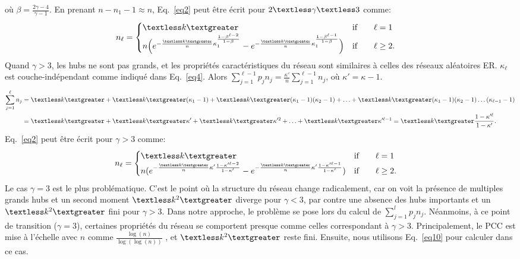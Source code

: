 où $\beta=\frac{2\gamma-4}{\gamma-1}$. En prenant $n-n_1-1 \approx n$, Eq.~\ref{eq2} peut être écrit pour $2\textless \gamma \textless 3$ comme:
\begin{align}
n_{\ell} &=
\begin{cases}
\km & \text{if}\qquad \ell=1 \\
n\Big(e^{-\frac{\km}{n}\kappa_1^{\frac{1-\beta^{\ell-2}}{1-\beta}}}-e^{-\frac{\km}{n}\kappa_1^{\frac{1-\beta^{\ell-1}}{1-\beta}}}\Big) & \text{if}\qquad \ell \ge 2.
\end{cases}
\label{eq8}
\end{align}
Quand $\gamma> 3 $, les hubs ne sont pas grands, et les propriétés caractéristiques du réseau sont similaires à celles des réseaux aléatoires ER.
 $\kappa_{\ell}$ est couche-indépendant comme indiqué dans Eq.~\ref{eq4}.
Alors $\sum_{j=1}^{\ell-1}p_j n_j=\frac{\kappa'}{n}\sum_{j=1}^{\ell-1}n_j$, où $\kappa'=\kappa-1$.  
\begin{align}
\sum_{j=1}^{\ell}n_j &=\km+\km(\kappa_1-1)+\km(\kappa_1-1)(\kappa_2-1)+\ldots+\km(\kappa_1-1)(\kappa_2-1)\ldots(\kappa_{\ell-1}-1) \nonumber\\
&=\km+\km\kappa'+\km\kappa'^2+\ldots+\km\kappa'^{\ell-1}=\km\frac{1-\kappa'^{\ell}}{1-\kappa'}. 
\label{eq9}
\end{align}
Eq.~\ref{eq2} peut être écrit pour $\gamma>3$ comme:
\begin{align}
n_{\ell} &=
\begin{cases}
\textless k \textgreater & \text{if}\qquad \ell=1 \\
n(e^{-\frac{\textless k \textgreater}{n}\kappa'\frac{1-\kappa'^{\ell-2}}{1-\kappa'}}-e^{-\frac{\km}{n}\kappa'\frac{1-\kappa'^{\ell-1}}{1-\kappa'}}) & \text{if}\qquad \ell \ge 2.
\end{cases}
\label{eq10}
\end{align}
Le cas $\gamma=3$ est le plus problématique. C'est le point où la structure du réseau change radicalement, car on voit la présence de multiples grands hubs et un second moment  $\textless k^2 \textgreater$ diverge pour $\gamma<3$, par contre une absence des hubs importants et un $\textless k^2  \textgreater$ fini pour $\gamma>3$.
Dans notre approche, le problème se pose lors du calcul de $\sum_{j=1}^{l}p_jn_j$. Néanmoins, à ce point de transition ($\gamma=3$), certaines propriétés du réseau se comportent presque comme celles correspondant à $\gamma>3$.
Principalement, le PCC est mise à l'échelle avec $n$ comme $\frac {\log(n)}{\log(\log(n))}$ \cite{Bollobas-Riordan2004}, et $\textless k^2  \textgreater$ reste fini. Ensuite, nous utilisons Eq.~\ref{eq10} pour calculer \nl dans ce cas. \\
